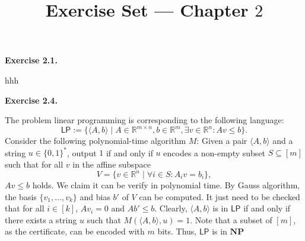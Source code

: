 \documentclass[a4paper]{article}
\title{Exercise Set --- Chapter $2$}
\date{}
\newenvironment{exercise}[1]{
	\par
	\noindent\textbf{Exercise #1.}\quad
}{
	\par
	\bigskip
}
\begin{document}
\maketitle

	\begin{exercise}{2.1}
	    hhh
	\end{exercise}

	\begin{exercise}{2.4}
		The problem linear programming is corresponding to the following language:
		\[
			\mathsf{LP} := \{\langle A,b \rangle \mid A \in \mathbb{R}^{m\times n}, b \in \mathbb{R}^m, \exists v \in \mathbb{R}^n: Av \leq b\}.
		\]
		Consider the following polynomial-time algorithm $M$: Given a pair $\langle A,b \rangle$ and a string $u \in \{0,1\}^*$, output $1$ if and only if $u$ encodes a non-empty subset $S \subseteq [m]$ such that for all $v$ in the affine subspace
		\[
			V = \{v \in \mathbb{R}^n \mid \forall i \in S: A_i v = b_i\},
		\]
		$Av \leq b$ holds. We claim it can be verify in polynomial time. By Gauss algorithm, the basis $\{v_1,\ldots,v_k\}$ and bias $b'$ of $V$ can be computed. It just need to be checked that for all $i\in [k]$, $A v_i = 0$ and $Ab' \leq b$. Clearly, $\langle A,b \rangle$ is in $\mathsf{LP}$ if and only if there exists a string $u$ such that $M(\langle A,b \rangle, u) = 1$. Note that a subset of $[m]$, as the certificate, can be encoded with $m$ bits. Thus, $\mathsf{LP}$ is in $\mathbf{NP}$
	\end{exercise}
\end{document}

